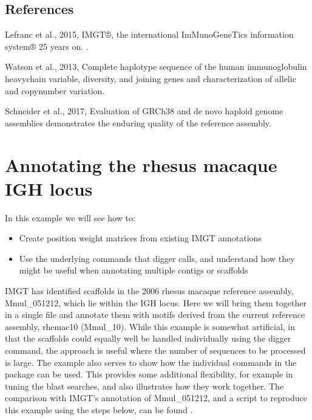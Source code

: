 \documentclass[letterpaper,10pt,english]{sphinxmanual}
\begin{document}
\section{References}
\label{\detokenize{examples/human_igh:references}}
\sphinxAtStartPar
Lefranc et al., 2015, IMGT®, the international ImMunoGeneTics information system® 25 years on.  .

\sphinxAtStartPar
Watson et al., 2013, Complete haplotype sequence of the human immunoglobulin heavy\sphinxhyphen{}chain variable, diversity, and joining genes and characterization of allelic and copy\sphinxhyphen{}number variation.  

\sphinxAtStartPar
Schneider et al., 2017, Evaluation of GRCh38 and de novo haploid genome assemblies demonstrates the enduring quality of the reference assembly.  

\sphinxstepscope


\chapter{Annotating the rhesus macaque IGH locus}
\label{\detokenize{examples/rhesus_igh:annotating-the-rhesus-macaque-igh-locus}}\label{\detokenize{examples/rhesus_igh::doc}}
\sphinxAtStartPar
In this example we will see how to:
\begin{itemize}
\item {} 
\sphinxAtStartPar
Create position weight matrices from existing IMGT annotations

\item {} 
\sphinxAtStartPar
Use the underlying commands that digger calls, and understand how they might be useful when annotating multiple contigs or scaffolds

\end{itemize}

\sphinxAtStartPar
IMGT has identified scaffolds in the 2006 rhesus macaque reference assembly, Mmul\_051212, which lie within the IGH locus. Here we will bring them together in a single file and annotate them with motifs derived from the current reference assembly, rhemac10 (Mmul\_10).
While this example is somewhat artificial, in that the scaffolds could equally well be handled individually using the digger command, the approach is useful where the number of sequences to be processed
is large. The example also serves to show how the individual commands in the package can be used. This provides some additional flexibility, for example in tuning the blast searches, and also illustrates how they work together.
The comparison with IMGT’s annotation of Mmul\_051212, and a script to reproduce this example using the steps below, can be found .
\end{document}
